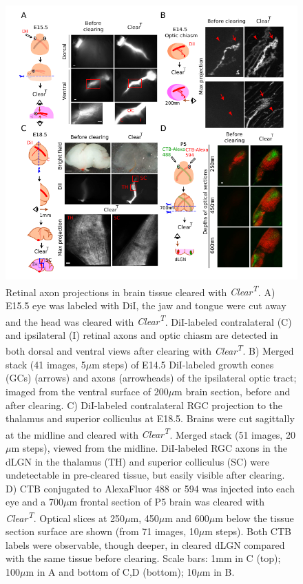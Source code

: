 \begin{figure}[hbtp]
    \begin{center}
        \includegraphics{Figures/ClearT_Fig2}
        \caption[Retinal axon projections in brain tissue cleared with \emph{Clear\textsuperscript{T}}.]
        {Retinal axon projections in brain tissue cleared with \emph{Clear\textsuperscript{T}}.
		A) E15.5 eye was labeled with DiI, the jaw and tongue were cut away and the head was cleared with \emph{Clear\textsuperscript{T}}.
		DiI-labeled contralateral (C) and ipsilateral (I) retinal axons and optic chiasm are detected in both dorsal and ventral views after clearing with \emph{Clear\textsuperscript{T}}.
		B) Merged stack (41 images, 5$\mu$m steps) of E14.5 DiI-labeled growth cones (GCs) (arrows) and axons (arrowheads) of the ipsilateral optic tract; imaged from the ventral surface of 200$\mu$m brain section, before and after clearing.
		C) DiI-labeled contralateral RGC projection to the thalamus and superior colliculus at E18.5.
		Brains were cut sagittally at the midline and cleared with \emph{Clear\textsuperscript{T}}.
		Merged stack (51 images, 20$\mu$m steps), viewed from the midline.
		DiI-labeled RGC axons in the dLGN in the thalamus (TH) and superior colliculus (SC) were undetectable in pre-cleared tissue, but easily visible after clearing.
		D) CTB conjugated to AlexaFluor 488 or 594 was injected into each eye and a 700$\mu$m frontal section of P5 brain was cleared with \emph{Clear\textsuperscript{T}}.
		Optical slices at 250$\mu$m, 450$\mu$m and 600$\mu$m below the tissue section surface are shown (from 71 images, 10$\mu$m steps).
		Both CTB labels were observable, though deeper, in cleared dLGN compared with the same tissue before clearing.
		Scale bars: 1mm in C (top); 100$\mu$m in A and bottom of C,D (bottom); 10$\mu$m in B.
		}
        \label{ClearT_Fig2}
    \end{center}
\end{figure}

